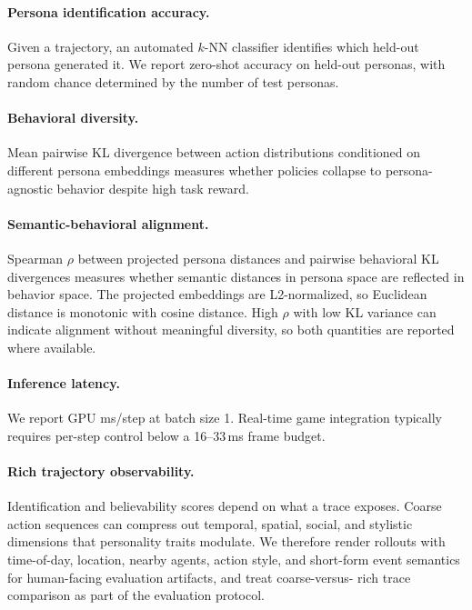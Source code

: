 \documentclass[conference]{IEEEtran}
\begin{document}
\paragraph{Persona identification accuracy.}
Given a trajectory, an automated $k$-NN classifier identifies which held-out
persona generated it. We report zero-shot accuracy on held-out personas, with
random chance determined by the number of test personas.

\paragraph{Behavioral diversity.}
Mean pairwise KL divergence between action distributions conditioned on different
persona embeddings measures whether policies collapse to persona-agnostic
behavior despite high task reward.

\paragraph{Semantic-behavioral alignment.}
Spearman $\rho$ between projected persona distances and pairwise behavioral KL
divergences measures whether semantic distances in persona space are reflected
in behavior space. The projected embeddings are L2-normalized, so Euclidean
distance is monotonic with cosine distance. High $\rho$ with low KL variance can
indicate alignment without meaningful diversity, so both quantities are reported
where available.

\paragraph{Inference latency.}
We report GPU ms/step at batch size 1. Real-time game integration typically
requires per-step control below a 16--33\,ms frame budget.

\paragraph{Rich trajectory observability.}
Identification and believability scores depend on what a trace exposes.
Coarse action sequences can compress out temporal, spatial, social, and
stylistic dimensions that personality traits modulate. We therefore render
rollouts with time-of-day, location, nearby agents, action style, and short-form
event semantics for human-facing evaluation artifacts, and treat coarse-versus-
rich trace comparison as part of the evaluation protocol.

\end{document}
